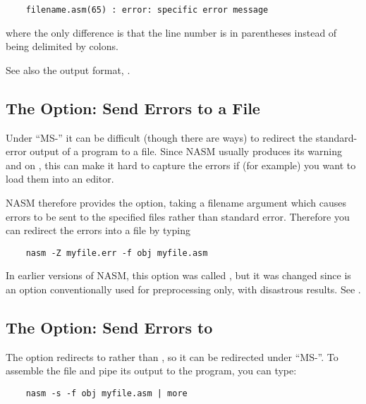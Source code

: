 \begin{lstlisting}
	filename.asm(65) : error: specific error message
\end{lstlisting}

where the only difference is that the line number is in parentheses
instead of being delimited by colons.

See also the  output format, .

\subsection{The  Option: Send Errors to a File}
\label{subsec:opt-Z-cap}

Under ``MS-'' it can be difficult (though there are
ways) to redirect the standard-error output of a program to a file.
Since NASM usually produces its warning and 
on , this can make it hard to capture the
errors if (for example) you want to load them into an editor.

NASM therefore provides the  option, taking a filename argument
which causes errors to be sent to the specified files rather than standard
error. Therefore you can redirect the errors
into a file by typing

\begin{lstlisting}
	nasm -Z myfile.err -f obj myfile.asm
\end{lstlisting}

In earlier versions of NASM, this option was called ,
but it was changed since  is an option conventionally
used for preprocessing only, with disastrous results.
See .

\subsection{The  Option: Send Errors to }
\label{subsec:opt-s}

The  option redirects  to
 rather than , so it can be redirected
under ``MS-''. To assemble the file 
and pipe its output to the  program, you can type:

\begin{lstlisting}
	nasm -s -f obj myfile.asm | more
\end{lstlisting}

